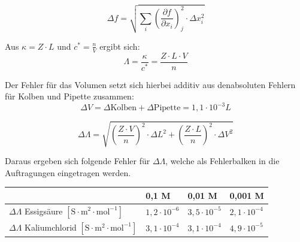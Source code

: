 \documentclass[12pt,a4paper,titlepage,headinclude,bibtotoc]{scrartcl}
\begin{document}
\begin{equation}
\Delta f = \sqrt{\sum_i \left(\frac{\partial f}{\partial x_i}\right)^2_j \cdot \Delta x_i^2}
\end{equation}

Aus $\kappa = Z \cdot L$ und $c^* =\frac{n}{V}$ ergibt sich:\\

\begin{equation}
\mathit{\Lambda} = \frac{\kappa}{c^*}= \frac{Z \cdot L \cdot V}{n}
\end{equation}

Der Fehler für das Volumen setzt sich hierbei additiv aus denabsoluten Fehlern für Kolben und Pipette zusammen:\\

\begin{equation}
\Delta V = \Delta \mathrm{Kolben} + \Delta \mathrm{Pipette} = 1,1 \cdot 10^{-3} L
\end{equation}




\begin{equation}
\Delta \mathit{\Lambda} = \sqrt{\left(\frac{Z \cdot V}{n}\right)^2 \cdot {\Delta L}^2 + \left(\frac{Z \cdot L}{n}\right)^2 \cdot \Delta V^2}
\end{equation}

Daraus ergeben sich folgende Fehler für $\Delta \mathit{\Lambda}$, welche als Fehlerbalken in die Auftragungen eingetragen werden.\\

\begin{table} [h]
\centering 
\begin{tabular}{|p{7cm}||p{2cm}|p{2cm}|p{2cm}|}
\hline
& 0,1 M & 0,01 M & 0,001 M \\
\hline
$\Delta \mathit{\Lambda}$ Essigsäure $[\mathrm{S \cdot m^{2} \cdot mol^{-1}}]$ & $1,2 \cdot 10^{-6}$ & $3,5 \cdot 10^{-5}$& $2,1 \cdot 10^{-4}$ \\
\hline
$\Delta \mathit{\Lambda}$ Kaliumchlorid $[\mathrm{S \cdot m^{2} \cdot mol^{-1}}]$ &$3,1 \cdot 10^{-4}$ & $3,1 \cdot 10^{-4}$ & $4,9 \cdot 10^{-5}$ \\
\hline
\end{tabular}
\end{table}
\end{document}
